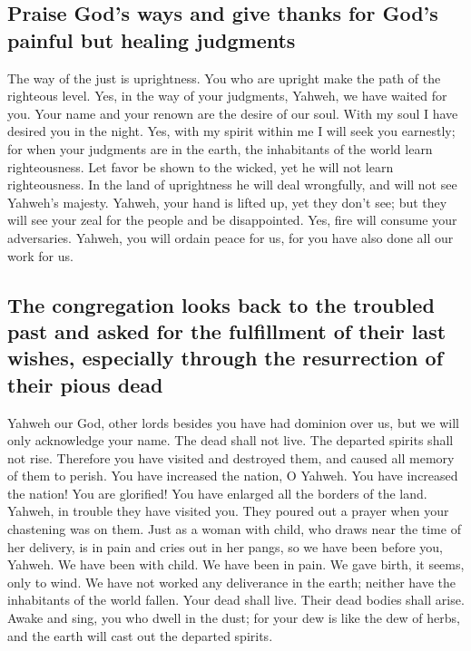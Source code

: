 \hypertarget{praise-gods-ways-and-give-thanks-for-gods-painful-but-healing-judgments}{%
\subsection{Praise God's ways and give thanks for God's painful but
healing
judgments}\label{praise-gods-ways-and-give-thanks-for-gods-painful-but-healing-judgments}}

 The way of the just is uprightness. You who are upright
make the path of the righteous level.  Yes, in the way of
your judgments, Yahweh, we have waited for you. Your name and your
renown are the desire of our soul.  With my soul I have
desired you in the night. Yes, with my spirit within me I will seek you
earnestly; for when your judgments are in the earth, the inhabitants of
the world learn righteousness.  Let favor be shown to the
wicked, yet he will not learn righteousness. In the land of uprightness
he will deal wrongfully, and will not see Yahweh's majesty.
 Yahweh, your hand is lifted up, yet they don't see; but
they will see your zeal for the people and be disappointed. Yes, fire
will consume your adversaries.  Yahweh, you will ordain
peace for us, for you have also done all our work for us.

\hypertarget{the-congregation-looks-back-to-the-troubled-past-and-asked-for-the-fulfillment-of-their-last-wishes-especially-through-the-resurrection-of-their-pious-dead}{%
\subsection{The congregation looks back to the troubled past and asked
for the fulfillment of their last wishes, especially through the
resurrection of their pious
dead}\label{the-congregation-looks-back-to-the-troubled-past-and-asked-for-the-fulfillment-of-their-last-wishes-especially-through-the-resurrection-of-their-pious-dead}}

 Yahweh our God, other lords besides you have had
dominion over us, but we will only acknowledge your name.
 The dead shall not live. The departed spirits shall not
rise. Therefore you have visited and destroyed them, and caused all
memory of them to perish.  You have increased the nation,
O Yahweh. You have increased the nation! You are glorified! You have
enlarged all the borders of the land.  Yahweh, in trouble
they have visited you. They poured out a prayer when your chastening was
on them.  Just as a woman with child, who draws near the
time of her delivery, is in pain and cries out in her pangs, so we have
been before you, Yahweh.  We have been with child. We
have been in pain. We gave birth, it seems, only to wind. We have not
worked any deliverance in the earth; neither have the inhabitants of the
world fallen.  Your dead shall live. Their dead bodies
shall arise. Awake and sing, you who dwell in the dust; for your dew is
like the dew of herbs, and the earth will cast out the departed spirits.

